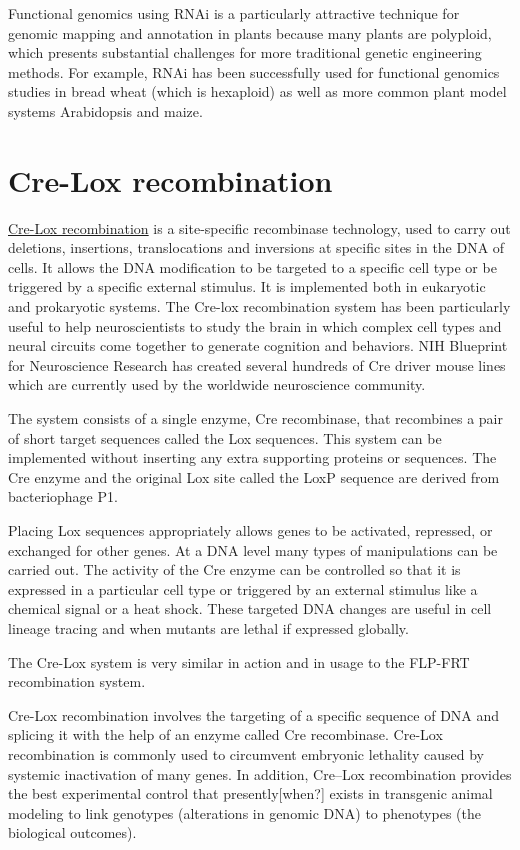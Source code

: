 Functional genomics using RNAi is a particularly attractive technique for genomic mapping and annotation in plants because many plants are polyploid, which presents substantial challenges for more traditional genetic engineering methods. For example, RNAi has been successfully used for functional genomics studies in bread wheat (which is hexaploid) as well as more common plant model systems Arabidopsis and maize.

\hypertarget{cre-lox-recombination}{%
\section{Cre-Lox recombination}\label{cre-lox-recombination}}

\href{https://en.wikipedia.org/wiki/Cre-Lox_recombination}{Cre-Lox recombination} is a site-specific recombinase technology, used to carry out deletions, insertions, translocations and inversions at specific sites in the DNA of cells. It allows the DNA modification to be targeted to a specific cell type or be triggered by a specific external stimulus. It is implemented both in eukaryotic and prokaryotic systems. The Cre-lox recombination system has been particularly useful to help neuroscientists to study the brain in which complex cell types and neural circuits come together to generate cognition and behaviors. NIH Blueprint for Neuroscience Research has created several hundreds of Cre driver mouse lines which are currently used by the worldwide neuroscience community.

The system consists of a single enzyme, Cre recombinase, that recombines a pair of short target sequences called the Lox sequences. This system can be implemented without inserting any extra supporting proteins or sequences. The Cre enzyme and the original Lox site called the LoxP sequence are derived from bacteriophage P1.

Placing Lox sequences appropriately allows genes to be activated, repressed, or exchanged for other genes. At a DNA level many types of manipulations can be carried out. The activity of the Cre enzyme can be controlled so that it is expressed in a particular cell type or triggered by an external stimulus like a chemical signal or a heat shock. These targeted DNA changes are useful in cell lineage tracing and when mutants are lethal if expressed globally.

The Cre-Lox system is very similar in action and in usage to the FLP-FRT recombination system.

Cre-Lox recombination involves the targeting of a specific sequence of DNA and splicing it with the help of an enzyme called Cre recombinase. Cre-Lox recombination is commonly used to circumvent embryonic lethality caused by systemic inactivation of many genes. In addition, Cre--Lox recombination provides the best experimental control that presently{[}when?{]} exists in transgenic animal modeling to link genotypes (alterations in genomic DNA) to phenotypes (the biological outcomes).

